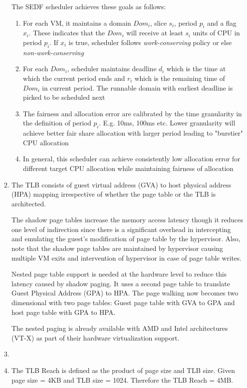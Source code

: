 \documentclass[11pt,a4paper,oneside]{article}
\begin{document}
\begin{enumerate}
		The SEDF scheduler achieves these goals as follows:
		\begin{enumerate}
			\item For each VM, it maintains a domain $Dom_i$, slice $s_i$, period $p_i$ and a flag $x_i$. These indicates that the $Dom_i$ will receive at least $s_i$ units of CPU in period $p_i$. If $x_i$ is true, scheduler follows \emph{work-conserving} policy or else \emph{non-work-conserving}
			\item For each $Dom_i$, scheduler maintains deadline $d_i$ which is the time at which the current period ends and $r_i$ which is the remaining time of $Dom_i$ in current period. The runnable domain with earliest deadline is picked to be scheduled next
			\item The fairness and allocation error are calibrated by the time granularity in the definition of period $p_i$. E.g. 10ms, 100ms etc. Lower granularity will achieve better fair share allocation with larger period leading to "burstier" CPU allocation
			\item In general, this scheduler can achieve consistently low allocation error for different target CPU allocation while maintaining fairness of allocation
		\end{enumerate}
 		\item The TLB consists of guest virtual address (GVA) to host physical address (HPA) mapping irrespective of whether the page table or the TLB is architected.
 		
 		The shadow page tables increase the memory access latency though it reduces one level of indirection since there is a significant overhead in intercepting and emulating the guest's modification of page table by the hypervisor. Also, note that the shadow page tables are maintained by hypervisor causing multiple VM exits and intervention of hypervisor in case of page table writes.
 		
 		Nested page table support is needed at the hardware level to reduce this latency caused by shadow paging. It uses a second page table to translate Guest Physical Address (GPA) to HPA. The page walking now becomes two dimensional with two page tables: Guest page table with GVA to GPA and host page table with GPA to HPA. 
 		
 		The nested paging is already available with AMD and Intel architectures (VT-X) as part of their hardware virtualization support.
 		
		\item 
		\item The TLB Reach is defined as the product of page size and TLB size. Given page size = 4KB and TLB size = 1024. Therefore the TLB Reach = 4MB.
		

\end{enumerate}
\end{document}
